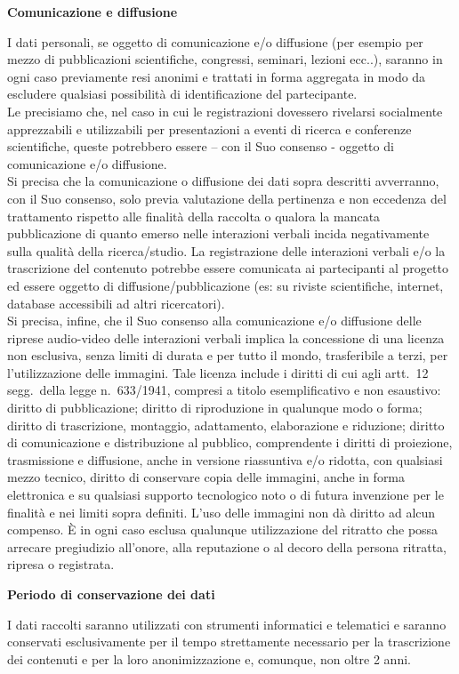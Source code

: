 \documentclass[10pt,a4paper]{article}
\newcommand{\sezione}[1]{\par\needspace{4\baselineskip}\textbf{#1}\par}
\begin{document}
\medskip
\sezione{Comunicazione e diffusione}
I dati personali, se oggetto di comunicazione e/o diffusione (per esempio per mezzo di
pubblicazioni scientifiche, congressi, seminari, lezioni ecc..), saranno in ogni caso
previamente resi anonimi e trattati in forma aggregata in modo da escludere qualsiasi
possibilità di identificazione del partecipante.\\
Le precisiamo che, nel caso in cui le registrazioni dovessero rivelarsi socialmente
apprezzabili e utilizzabili per presentazioni a eventi di ricerca e conferenze scientifiche,
queste potrebbero essere -- con il Suo consenso - oggetto di comunicazione e/o diffusione.\\
Si precisa che la comunicazione o diffusione dei dati sopra descritti avverranno, con il Suo
consenso, solo previa valutazione della pertinenza e non eccedenza del trattamento rispetto
alle finalità della raccolta o qualora la mancata pubblicazione di quanto emerso nelle
interazioni verbali incida negativamente sulla qualità della ricerca/studio. La registrazione
delle interazioni verbali e/o la trascrizione del contenuto potrebbe essere comunicata ai
partecipanti al progetto ed essere oggetto di diffusione/pubblicazione (es: su riviste
scientifiche, internet, database accessibili ad altri ricercatori).\\
Si precisa, infine, che il Suo consenso alla comunicazione e/o diffusione delle riprese
audio-video delle interazioni verbali implica la concessione di una licenza non esclusiva,
senza limiti di durata e per tutto il mondo, trasferibile a terzi, per l'utilizzazione delle
immagini. Tale licenza include i diritti di cui agli artt.~12 segg.\ della legge n.~633/1941,
compresi a titolo esemplificativo e non esaustivo: diritto di pubblicazione; diritto di
riproduzione in qualunque modo o forma; diritto di trascrizione, montaggio, adattamento,
elaborazione e riduzione; diritto di comunicazione e distribuzione al pubblico, comprendente i
diritti di proiezione, trasmissione e diffusione, anche in versione riassuntiva e/o ridotta,
con qualsiasi mezzo tecnico, diritto di conservare copia delle immagini, anche in forma
elettronica e su qualsiasi supporto tecnologico noto o di futura invenzione per le finalità e
nei limiti sopra definiti. L'uso delle immagini non dà diritto ad alcun compenso. È in ogni
caso esclusa qualunque utilizzazione del ritratto che possa arrecare pregiudizio all'onore,
alla reputazione o al decoro della persona ritratta, ripresa o registrata.

\bigskip
\sezione{Periodo di conservazione dei dati}
I dati raccolti saranno utilizzati con strumenti informatici e telematici e saranno conservati
esclusivamente per il tempo strettamente necessario per la trascrizione dei contenuti e per la
loro anonimizzazione e, comunque, non oltre 2 anni.
\end{document}
